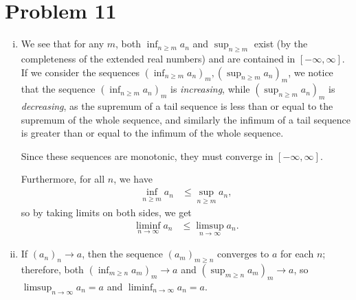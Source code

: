\documentclass[10pt]{mypackage}
\begin{document}
\section{Problem 11}%
\begin{enumerate}[(i)]
  \item We see that for any $m$, both $\inf_{n\geq m} a_n$ and $\sup_{n\geq m}$ exist (by the completeness of the extended real numbers) and are contained in $[-\infty,\infty]$. If we consider the sequences $\left( \inf_{n\geq m}a_n \right)_{m},\left( \sup_{n\geq m}a_n \right)_{m}$, we notice that the sequence $\left( \inf_{n\geq m}a_n \right)_{m}$ is \textit{increasing}, while $\left( \sup_{n\geq m}a_n \right)_{m}$ is \textit{decreasing}, as the supremum of a tail sequence is less than or equal to the supremum of the whole sequence, and similarly the infimum of a tail sequence is greater than or equal to the infimum of the whole sequence.\newline

    Since these sequences are monotonic, they must converge in $\left[ -\infty,\infty \right]$.\newline

    Furthermore, for all $n$, we have
    \begin{align*}
      \inf_{n\geq m}a_n &\leq \sup_{n\geq m}a_n,
    \end{align*}
    so by taking limits on both sides, we get
    \begin{align*}
      \liminf_{n\rightarrow\infty} a_n &\leq \limsup_{n\rightarrow\infty}a_n.
    \end{align*}
  \item If $\left( a_n \right)_n\rightarrow a$, then the sequence $\left( a_m \right)_{m\geq n}$ converges to $a$ for each $n$; therefore, both $\left( \inf_{m\geq n}a_m \right)_{m}\rightarrow a$ and $\left( \sup_{m\geq n}a_m \right)_{m}\rightarrow a$, so $\limsup_{n\rightarrow\infty}a_n = a$ and $\liminf_{n\rightarrow\infty}a_n = a$.\newline


\end{enumerate}
\end{document}
